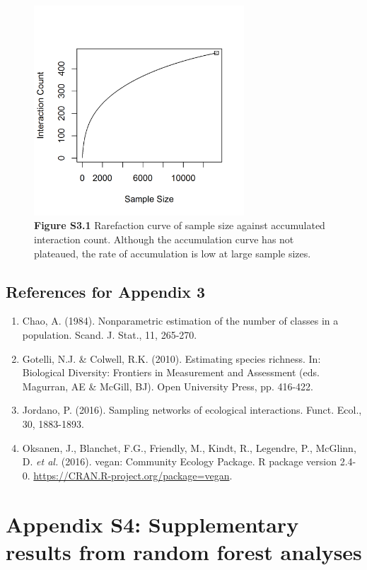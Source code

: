 \documentclass[11pt]{article}
\begin{document}
\begin{figure}[H]
\caption[]{\textbf{Figure S3.1} Rarefaction curve of sample size against accumulated interaction count. Although the accumulation curve has not plateaued, the rate of accumulation is low at large sample sizes.  }
\centering\includegraphics[width=0.7\textwidth]{../Figures/Rarefaction.png} 
\end{figure}

\subsection*{References for Appendix 3}

\begin{enumerate}
\item Chao, A. (1984). Nonparametric estimation of the number of classes in a population. Scand. J. Stat., 11, 265-270.
\item Gotelli, N.J. \& Colwell, R.K. (2010). Estimating species richness. In: Biological Diversity: Frontiers in Measurement and Assessment (eds. Magurran, AE \& McGill, BJ). Open University Press, pp. 416-422.
\item Jordano, P. (2016). Sampling networks of ecological interactions. Funct. Ecol., 30, 1883-1893.
\item Oksanen, J., Blanchet, F.G., Friendly, M., Kindt, R., Legendre, P., McGlinn, D. \emph{et al. }(2016). vegan: Community Ecology Package. R package version 2.4-0.  \url{https://CRAN.R-project.org/package=vegan}. 
\end{enumerate}

\newpage

\section{Appendix S4: Supplementary results from random forest analyses}
\end{document}
